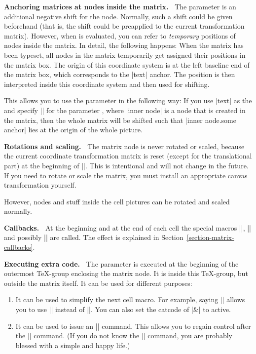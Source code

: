 \begin{command}{\pgfmatrix{}}
    \medskip
    \textbf{Anchoring matrices at nodes inside the matrix.\ }
    The parameter  is an additional negative shift for the node.
    Normally, such a shift could be given beforehand (that is, the shift could
    be preapplied to the current transformation matrix). However, when
     is evaluated, you can refer to \emph{temporary} positions of
    nodes inside the matrix. In detail, the following happens: When the matrix
    has been typeset, all nodes in the matrix temporarily get assigned their
    positions in the matrix box. The origin of this coordinate system is at the
    left baseline end of the matrix box, which corresponds to the |text|
    anchor. The position  is then interpreted inside this
    coordinate system and then used for shifting.

    This allows you to use the parameter  in the following way: If
    you use |text| as the  and specify
    || for the parameter ,
    where |inner node| is a node that is created in the matrix, then the whole
    matrix will be shifted such that |inner node.some anchor| lies at the
    origin of the whole picture.


    \medskip
    \textbf{Rotations and scaling.\ }
    The matrix node is never rotated or scaled, because the current coordinate
    transformation matrix is reset (except for the translational part) at the
    beginning of |\pgfmatrix|. This is intentional and will not change in the
    future. If you need to rotate or scale the matrix, you must install an
    appropriate canvas transformation yourself.

    However, nodes and stuff inside the cell pictures can be rotated and scaled
    normally.


    \medskip
    \textbf{Callbacks.\ }
    At the beginning and at the end of each cell the special macros
    |\pgfmatrixbegincode|, |\pgfmatrixendcode| and possibly
    |\pgfmatrixemptycode| are called. The effect is explained in
    Section~\ref{section-matrix-callbacks}.


    \medskip
    \textbf{Executing extra code.\ }
    The parameter  is executed at the beginning of the outermost
    \TeX-group enclosing the matrix node. It is inside this \TeX-group, but
    outside the matrix itself. It can be used for different purposes:
    \begin{enumerate}
        \item It can be used to simplify the next cell macro. For example,
            saying |\let\&=\pgfmatrixnextcell| allows you to use |\&| instead
            of |\pgfmatrixnextcell|. You can also set the catcode of |&| to
            active.
        \item It can be used to issue an |\aftergroup| command. This allows you
            to regain control after the |\pgfmatrix| command. (If you do not
            know the |\aftergroup| command, you are probably blessed with a
            simple and happy life.)
    \end{enumerate}



\end{command}
